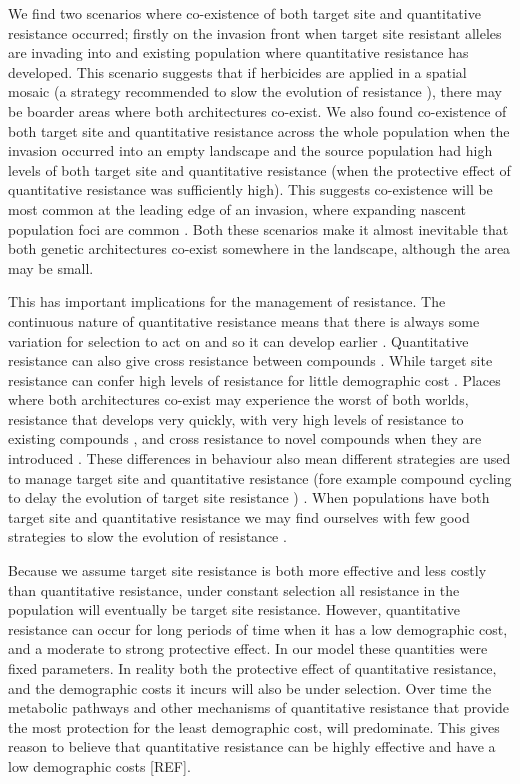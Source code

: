 \documentclass[10pt,letterpaper]{article}
\begin{document}
We find two scenarios where co-existence of both target site and quantitative resistance occurred; firstly on the invasion front when target site resistant alleles are invading into and existing population where quantitative resistance has developed. This scenario suggests that if herbicides are applied in a spatial mosaic (a strategy recommended to slow the evolution of resistance \cite{Rex2013}), there may be boarder areas where both architectures co-exist. We also found co-existence of both target site and quantitative resistance across the whole population when the invasion occurred into an empty landscape and the source population had high levels of both target site and quantitative resistance (when the protective effect of quantitative resistance was sufficiently high). This suggests co-existence will be most common at the leading edge of an invasion, where expanding nascent population foci are common \cite{Mooy1988}. Both these scenarios make it almost inevitable that both genetic architectures co-exist somewhere in the landscape, although the area may be small.

This has important implications for the management of resistance. The continuous nature of quantitative resistance means that there is always some variation for selection to act on and so it can develop earlier \cite{Dely2010newPhy}. Quantitative resistance can also give cross resistance between compounds \cite{Bauc2016, Neve2007}. While target site resistance can confer high levels of resistance for little demographic cost \cite{Bauc2016}. Places where both architectures co-exist may experience the worst of both worlds, resistance that develops very quickly, with very high levels of resistance to existing compounds \cite{Vera2015}, and cross resistance to novel compounds when they are introduced \cite{Neve2007}. These differences in behaviour also mean different strategies are used to manage target site and quantitative resistance (fore example compound cycling to delay the evolution of target site resistance \cite{Rex2013}) \cite{Gard1998}. When populations have both target site and quantitative resistance we may find ourselves with few good strategies to slow the evolution of resistance \cite{Gard1998}. 

Because we assume target site resistance is both more effective and less costly than quantitative resistance, under constant selection all resistance in the population will eventually be target site resistance. However, quantitative resistance can occur for long periods of time when it has a low demographic cost, and a moderate to strong protective effect. In our model these quantities were fixed parameters. In reality both the protective effect of quantitative resistance, and the demographic costs it incurs will also be under selection. Over time the metabolic pathways and other mechanisms of quantitative resistance that provide the most protection for the least demographic cost, will predominate. This gives reason to believe that quantitative resistance can be highly effective and have a low demographic costs [REF].    
\end{document}
